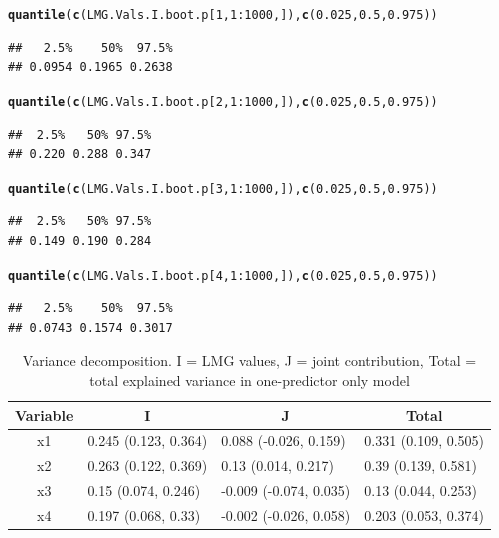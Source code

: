 \documentclass[11pt,a4paper,twoside]{book}
\makeatletter
\newcommand{\hlnum}[1]{\textcolor[rgb]{0.686,0.059,0.569}{#1}}%
\newcommand{\hlopt}[1]{\textcolor[rgb]{0,0,0}{#1}}%
\newcommand{\hlstd}[1]{\textcolor[rgb]{0.345,0.345,0.345}{#1}}%
\newcommand{\hlkwd}[1]{\textcolor[rgb]{0.737,0.353,0.396}{\textbf{#1}}}%
\newenvironment{kframe}{%
 \def\at@end@of@kframe{}%
 \ifinner\ifhmode%
  \def\at@end@of@kframe{\end{minipage}}%
  \begin{minipage}{\columnwidth}%
 \fi\fi%
 \def\FrameCommand##1{\hskip\@totalleftmargin \hskip-\fboxsep
 \colorbox{shadecolor}{##1}\hskip-\fboxsep
     \hskip-\linewidth \hskip-\@totalleftmargin \hskip\columnwidth}%
 \MakeFramed {\advance\hsize-\width
   \@totalleftmargin\z@ \linewidth\hsize
   \@setminipage}}%
 {\par\unskip\endMakeFramed%
 \at@end@of@kframe}
\newenvironment{knitrout}{}{} %
\makeatother
\begin{document}
\begin{knitrout}
\begin{kframe}
\begin{alltt}
\hlkwd{quantile}\hlstd{(}\hlkwd{c}\hlstd{(LMG.Vals.I.boot.p[}\hlnum{1}\hlstd{,}\hlnum{1}\hlopt{:}\hlnum{1000}\hlstd{,]),} \hlkwd{c}\hlstd{(}\hlnum{0.025}\hlstd{,} \hlnum{0.5}\hlstd{,} \hlnum{0.975}\hlstd{))}
\end{alltt}
\begin{verbatim}
##   2.5%    50%  97.5% 
## 0.0954 0.1965 0.2638
\end{verbatim}
\begin{alltt}
\hlkwd{quantile}\hlstd{(}\hlkwd{c}\hlstd{(LMG.Vals.I.boot.p[}\hlnum{2}\hlstd{,}\hlnum{1}\hlopt{:}\hlnum{1000}\hlstd{,]),} \hlkwd{c}\hlstd{(}\hlnum{0.025}\hlstd{,} \hlnum{0.5}\hlstd{,} \hlnum{0.975}\hlstd{))}
\end{alltt}
\begin{verbatim}
##  2.5%   50% 97.5% 
## 0.220 0.288 0.347
\end{verbatim}
\begin{alltt}
\hlkwd{quantile}\hlstd{(}\hlkwd{c}\hlstd{(LMG.Vals.I.boot.p[}\hlnum{3}\hlstd{,}\hlnum{1}\hlopt{:}\hlnum{1000}\hlstd{,]),} \hlkwd{c}\hlstd{(}\hlnum{0.025}\hlstd{,} \hlnum{0.5}\hlstd{,} \hlnum{0.975}\hlstd{))}
\end{alltt}
\begin{verbatim}
##  2.5%   50% 97.5% 
## 0.149 0.190 0.284
\end{verbatim}
\begin{alltt}
\hlkwd{quantile}\hlstd{(}\hlkwd{c}\hlstd{(LMG.Vals.I.boot.p[}\hlnum{4}\hlstd{,}\hlnum{1}\hlopt{:}\hlnum{1000}\hlstd{,]),} \hlkwd{c}\hlstd{(}\hlnum{0.025}\hlstd{,} \hlnum{0.5}\hlstd{,} \hlnum{0.975}\hlstd{))}
\end{alltt}
\begin{verbatim}
##   2.5%    50%  97.5% 
## 0.0743 0.1574 0.3017
\end{verbatim}
\end{kframe}
\end{knitrout}



\begin{table}[h]
\centering
\begin{tabular}{clll}
  \hline
  \multicolumn{1}{c}{\textbf{Variable}} & \multicolumn{1}{c}{\textbf{I}} &\multicolumn{1}{c}{\textbf{J}} & \multicolumn{1}{c}{\textbf{Total}} \\
  \hline
x1 & 0.245 (0.123, 0.364)  & 0.088 (-0.026, 0.159)   & 0.331 (0.109, 0.505)  \\ 
x2 & 0.263 (0.122, 0.369)  & 0.13 (0.014, 0.217)   & 0.39 (0.139, 0.581)  \\ 
x3 & 0.15 (0.074, 0.246)  & -0.009 (-0.074, 0.035)   & 0.13 (0.044, 0.253)  \\ 
x4 & 0.197 (0.068, 0.33)  & -0.002 (-0.026, 0.058)   & 0.203 (0.053, 0.374)  \\ 

   \hline
\end{tabular}
\caption{Variance decomposition. I = LMG values, J = joint contribution, Total = total explained variance in one-predictor only model}
\label{tbl:fundus.to.SLO2}
\end{table}
\end{document}
